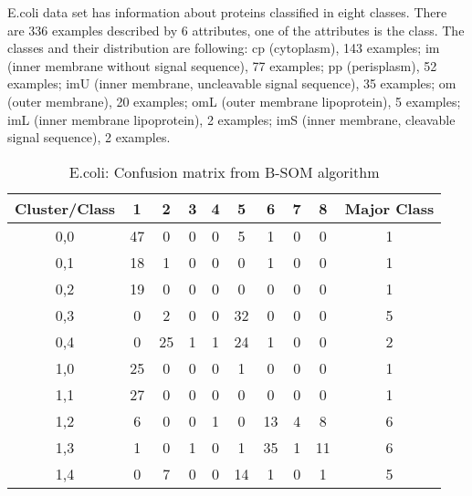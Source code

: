 \documentclass[10pt, conference, compsocconf]{IEEEtran}
\begin{document}
E.coli data set has information about proteins classified in eight classes. There are 336 examples described by 6 attributes, one of the attributes is the class. The classes and their distribution are following: cp (cytoplasm), 143 examples; im (inner membrane without signal sequence), 77 examples; pp (perisplasm), 52 examples; imU (inner membrane, uncleavable signal sequence), 35 examples; om (outer membrane), 20 examples; omL (outer membrane lipoprotein), 5 examples; imL (inner membrane lipoprotein), 2 examples; imS (inner membrane, cleavable signal sequence), 2 examples.

\begin{table}[!h]
\renewcommand{\arraystretch}{1.2}
\begin{center}
\caption{E.coli: Confusion matrix from B-SOM algorithm}
\begin{tabular}{|c|c|c|c|c|c|c|c|c||c|}
\hline
Cluster/Class & 1 & 2 & 3 & 4 & 5 & 6 & 7 & 8 & Major Class\\ \hline
0,0 & 47 & 0 & 0 & 0 & 5 & 1 & 0 & 0 & 1\\ \hline
0,1 & 18 & 1 & 0 & 0 & 0 & 1 & 0 & 0 & 1\\ \hline
0,2 & 19 & 0 & 0 & 0 & 0 & 0 & 0 & 0 & 1\\ \hline
0,3 & 0 & 2 & 0 & 0 & 32 & 0 & 0 & 0 & 5\\ \hline
0,4 & 0 & 25 & 1 & 1 & 24 & 1 & 0 & 0 & 2\\ \hline \hline
1,0 & 25 & 0 & 0 & 0 & 1 & 0 & 0 & 0 & 1\\ \hline
1,1 & 27 & 0 & 0 & 0 & 0 & 0 & 0 & 0 & 1\\ \hline
1,2 & 6 & 0 & 0 & 1 & 0 & 13 & 4 & 8 & 6\\ \hline
1,3 & 1 & 0 & 1 & 0 & 1 & 35 & 1 & 11 & 6\\ \hline
1,4 & 0 & 7 & 0 & 0 & 14 & 1 & 0 & 1 & 5\\ \hline

\end{tabular}
\label{ecoli_batch}
\end{center}
\end{table}
\end{document}
